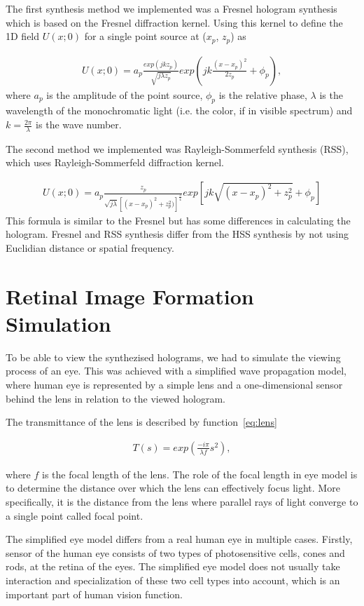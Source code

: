 \documentclass[12pt,a4paper,english
]{tunithesis}
\begin{document}
The first synthesis method we implemented was a Fresnel hologram synthesis which is based on the Fresnel diffraction kernel. Using this kernel to define the 1D field $U(x;0)$ for a single point source at  ($x_p$, $z_p$) as

\begin{align}
  \label{eq:fresnel}
  U(x;0) = a_p\frac{exp(j k z_p)}{\sqrt{j \lambda z_p}}exp(jk\frac{(x-x_p)^2}{2z_p}+\phi_p),
\end{align}
where $a_p$ is the amplitude of the point source, $\phi_p$ is the relative phase, $\lambda$ is the wavelength of the monochromatic light (i.e. the color, if in visible spectrum) and $k = \frac{2\pi}{\lambda}$ is the wave number.

The second method we implemented was Rayleigh-Sommerfeld synthesis (RSS), which uses Rayleigh-Sommerfeld diffraction kernel. 

\begin{align}
  \label{eq:rss}
  U(x;0) = a_p\frac{z_p}{\sqrt{j \lambda}[(x-x_p)^2+z_p^2)]^\frac{3}{4}}exp[jk\sqrt{(x-x_p)^2+z_p^2}+\phi_p]
\end{align}
This formula is similar to the Fresnel but has some differences in calculating the hologram. Fresnel and RSS synthesis differ from the HSS synthesis by not using Euclidian distance or spatial frequency.

\section{Retinal Image Formation Simulation}
To be able to view the synthezised holograms, we had to simulate the viewing process of an eye. This was achieved with a simplified wave propagation model, where human eye is represented by a simple lens and a one-dimensional sensor behind the lens in relation to the viewed hologram.

The transmittance of the lens is described by function~\ref{eq:lens}

\begin{align}
  \label{eq:lens}
  T(s) = exp(\frac{-i\pi}{\lambda f}s^2),
\end{align}

where $f$ is the focal length of the lens. The role of the focal length in eye model is to determine the distance over which the lens can effectively focus light. More specifically, it is the distance from the lens where parallel rays of light converge to a single point called focal point.

The simplified eye model differs from a real human eye in multiple cases. Firstly, sensor of the human eye consists of two types of photosensitive cells, cones and rods, at the retina of the eyes. The simplified eye model does not usually take interaction and specialization of these two cell types into account, which is an important part of human vision function.
\end{document}
